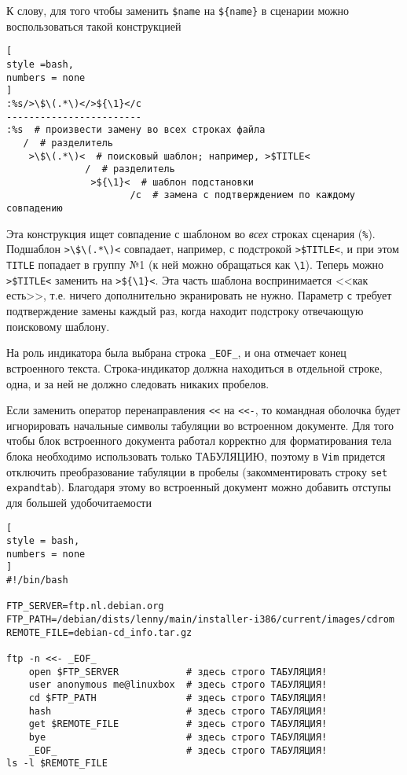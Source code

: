 \documentclass[%
	11pt,
	a4paper,
	utf8,
		]{article}
\begin{document}
К слову, для того чтобы заменить \verb|$name| на \verb|${name}| в сценарии можно воспользоваться такой конструкцией
\begin{lstlisting}[
style =bash,
numbers = none
]
:%s/>\$\(.*\)</>${\1}</c
------------------------
:%s  # произвести замену во всех строках файла
   /  # разделитель
    >\$\(.*\)<  # поисковый шаблон; например, >$TITLE<
              /  # разделитель
               >${\1}<  # шаблон подстановки
                      /c  # замена с подтверждением по каждому совпадению
\end{lstlisting}

Эта конструкция ищет совпадение с шаблоном во \emph{всех} строках сценария (\verb|%|). Подшаблон \verb|>\$\(.*\)<| совпадает, например, с подстрокой \verb|>$TITLE<|, и при этом \texttt{TITLE} попадает в группу №1 (к ней можно обращаться как \verb|\1|). Теперь можно \verb|>$TITLE<| заменить на \verb|>${\1}<|. Эта часть шаблона воспринимается <<как есть>>, т.е. ничего дополнительно экранировать не нужно. Параметр \texttt{c} требует подтверждение замены каждый раз, когда находит подстроку отвечающую поисковому шаблону.

На роль индикатора была выбрана строка \verb|_EOF_|, и она отмечает конец встроенного текста. Строка-индикатор должна находиться в отдельной строке, одна, и за ней не должно следовать никаких пробелов.

Если заменить оператор перенаправления \verb|<<| на \verb|<<-|, то командная оболочка будет игнорировать начальные символы табуляции во встроенном документе. Для того чтобы блок встроенного документа работал корректно для форматирования тела блока необходимо использовать только ТАБУЛЯЦИЮ, поэтому в \texttt{Vim} придется отключить преобразование табуляции в пробелы (закомментировать строку \verb|set expandtab|). Благодаря этому во встроенный документ можно добавить отступы для большей удобочитаемости
\begin{lstlisting}[
style = bash,
numbers = none
]
#!/bin/bash

FTP_SERVER=ftp.nl.debian.org
FTP_PATH=/debian/dists/lenny/main/installer-i386/current/images/cdrom
REMOTE_FILE=debian-cd_info.tar.gz

ftp -n <<- _EOF_
    open $FTP_SERVER            # здесь строго ТАБУЛЯЦИЯ!
    user anonymous me@linuxbox  # здесь строго ТАБУЛЯЦИЯ!
    cd $FTP_PATH                # здесь строго ТАБУЛЯЦИЯ!
    hash                        # здесь строго ТАБУЛЯЦИЯ!
    get $REMOTE_FILE            # здесь строго ТАБУЛЯЦИЯ!
    bye                         # здесь строго ТАБУЛЯЦИЯ!
    _EOF_                       # здесь строго ТАБУЛЯЦИЯ!
ls -l $REMOTE_FILE
\end{lstlisting}
\end{document}
